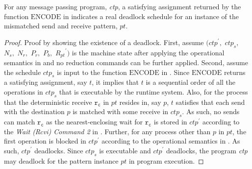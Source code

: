 \begin{lemma}
For any message passing program, \textit{ctp}, a satisfying assignment returned by the function $\mathrm{ENCODE}$ in  indicates a real deadlock schedule for an instance of the mismatched send and receive pattern, $\mathit{pt}$. 
\label{lemma:mismatch}
\end{lemma}
\begin{proof}
Proof by showing the existence of a deadlock. First, assume $(\mathit{ctp}^\prime,$ $\mathit{ctp}_s,$ $\mathit{N_s},$ $\mathit{N_r},$ $\mathit{P_r},$ $\mathit{P_b},$ $\mathit{R_{pt}}^\prime)$ is the machine state after applying the operational semantics in  and no reduction commands can be further applied. Second, assume the schedule $\mathit{ctp}_s$ is input to the function $\mathrm{ENCODE}$ in . Since $\mathrm{ENCODE}$ returns a satisfying assignment, say $\mathit{t}$, it implies that $\mathit{t}$ is a sequential order of all the operations in $\mathit{ctp}_s$ that is executable by the runtime system. Also, for the process that the deterministic receive $\mathtt{r_c}$ in $\mathit{pt}$ resides in, say $\mathit{p}$, $\mathit{t}$ satisfies that each send with the destination $\mathit{p}$ is matched with some receive in $\mathit{ctp}_s$. As such, no sends can match $\mathtt{r_c}$ as the nearest-enclosing wait for $\mathtt{r_c}$ is stored in $\mathit{ctp}^\prime$ according to the \emph{Wait (Rcvi) Command 2} in . Further, for any process other than $\mathit{p}$ in $\mathit{pt}$, the first operation is blocked in $\mathit{ctp}^\prime$ according to the operational semantics in . As such, $\mathit{ctp}^\prime$ deadlocks. Since $\mathit{ctp}_s$ is executable and $\mathit{ctp}^\prime$ deadlocks, the program \textit{ctp} may deadlock for the pattern instance $\mathit{pt}$ in program execution. 
\end{proof}



